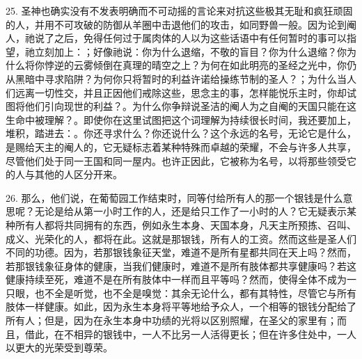 25. 圣神也确实没有不发表明确而不可动摇的言论来对抗这些极其无耻和疯狂顽固的人，并用不可攻破的防御从羊圈中击退他们的攻击，如同野兽一般。因为论到阉人，祂说了之后，免得任何过于属肉体的人以为这些话语中有任何暂时的事可以指望，祂立刻加上：；好像祂说：你为什么退缩，不敬的盲目？你为什么退缩？你为什么将你悖逆的云雾倾倒在真理的晴空之上？为何在如此明亮的圣经之光中，你仍从黑暗中寻求陷阱？为何你只将暂时的利益许诺给操练节制的圣人？；为什么当人们远离一切性交，并且正因他们戒除这些，思念主的事，怎样能悦乐主时，你却试图将他们引向现世的利益？。为什么你争辩说圣洁的阉人为之自阉的天国只能在这生命中被理解？。即使你在这里试图把这个词理解为持续很长时间，我还要加上，堆积，踏进去：。你还寻求什么？你还说什么？这个永远的名号，无论它是什么，是赐给天主的阉人的，它无疑标志着某种特殊而卓越的荣耀，不会与许多人共享，尽管他们处于同一王国和同一屋内。也许正因此，它被称为名号，以将那些领受它的人与其他的人区分开来。\newline{}\par

26. 那么，他们说，在葡萄园工作结束时，同等付给所有人的那一个银钱是什么意思呢？无论是给从第一小时工作的人，还是给只工作了一小时的人？它无疑表示某种所有人都将共同拥有的东西，例如永生本身、天国本身，凡天主所预拣、召叫、成义、光荣化的人，都将在此。这就是那银钱，所有人的工资。然而这些是圣人们不同的功德。因为，若那银钱象征天堂，难道不是所有星都共同在天上吗？然而，若那银钱象征身体的健康，当我们健康时，难道不是所有肢体都共享健康吗？若这健康持续至死，难道不是在所有肢体中一样而且平等吗？然而，使得全体不成为一只眼，也不全是听觉，也不全是嗅觉：其余无论什么，都有其特性，尽管它与所有肢体一样健康。如此，因为永生本身将平等地给予众人，一个相等的银钱分配给了所有人；但是，因为在永生本身中功绩的光将以区别照耀，在圣父的家里有；而且，借此，在不相异的银钱中，一人不比另一人活得更长；但在许多住处中，一人以更大的光荣受到尊荣。\par

